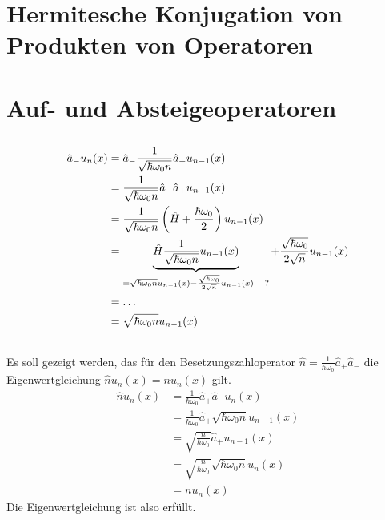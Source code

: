 \section{Hermitesche Konjugation von Produkten von Operatoren}

\section{Auf- und Absteigeoperatoren}

\subsection{}

\begin{align*}
 \hat a_- u_n(x) &= \hat a_- \frac1{\sqrt{\hbar \omega_0 n}} \hat a_+ u_{n-1}(x)\\
 &= \frac1{\sqrt{\hbar \omega_0 n}} \hat a_-\hat a_+ u_{n-1}(x)\\
 &= \frac1{\sqrt{\hbar \omega_0 n}} \del{\hat H + \frac{\hbar \omega_0}{2}} u_{n-1}(x)\\
 &= \underbrace{\hat H \frac1{\sqrt{\hbar \omega_0 n}} u_{n-1}(x)}_{= \sqrt{\hbar\omega_0 n} u_{n-1}(x) - \frac{\sqrt{\hbar \omega_0}}{2\sqrt{n}}u_{n-1}(x) \quad?} 
 + \frac{\sqrt{\hbar \omega_0}}{2 \sqrt{n}} u_{n-1}(x)\\
 &= \ldots\\
 &= \sqrt{\hbar \omega_0 n} u_{n-1}(x)
\end{align*}


\subsection{}

Es soll gezeigt werden, das für den Besetzungszahloperator $\hat n =
\frac1{\hbar\omega_0}\hat a_+\hat a_-$ die Eigenwertgleichung $\hat nu_n(x) =
nu_n(x)$ gilt.
\begin{align*}
    \hat n u_n(x) &= \frac1{\hbar\omega_0}\hat a_+\hat a_- u_n(x) \\
                  &= \frac1{\hbar\omega_0}\hat a_+ \sqrt{\hbar\omega_0n}u_{n-1}(x) \\
                  &= \sqrt{\frac{n}{\hbar\omega_0}} \hat a_+ u_{n-1}(x) \\
                  &= \sqrt{\frac{n}{\hbar\omega_0}} \sqrt{\hbar\omega_0n}u_n(x) \\
                  &= nu_n(x)
\end{align*}
Die Eigenwertgleichung ist also erfüllt.

\subsection{}
\subsection{}
\subsection{}


